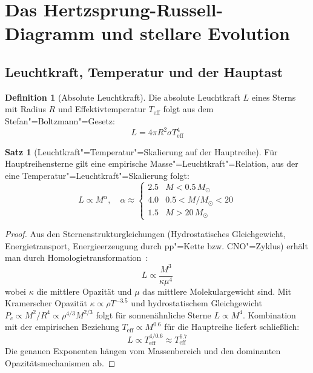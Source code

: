 ﻿\documentclass[a4paper,12pt]{article}
\theoremstyle{definition}
\newtheorem{definition}{Definition}
\newtheorem{satz}{Satz}
\begin{document}
\section{Das Hertzsprung-Russell-Diagramm und stellare Evolution}

\subsection{Leuchtkraft, Temperatur und der Hauptast}

\begin{definition}[Absolute Leuchtkraft]
    Die absolute Leuchtkraft $L$ eines Sterns mit Radius $R$ und
    Effektivtemperatur $T_{\text{eff}}$ folgt aus dem Stefan"=Boltzmann"=Gesetz:
    \[
        L = 4\pi R^2 \sigma T_{\text{eff}}^4
    \]
\end{definition}

\begin{satz}[Leuchtkraft"=Temperatur"=Skalierung auf der Hauptreihe]
\label{satz:hr}
    Für Hauptreihensterne gilt eine empirische Masse"=Leuchtkraft"=Relation,
    aus der eine Temperatur"=Leuchtkraft"=Skalierung folgt:
    \[
        L \propto M^\alpha, \quad \alpha \approx \begin{cases} 2.5 & M < 0.5\,M_\odot \\ 4.0 & 0.5 < M/M_\odot < 20 \\ 1.5 & M > 20\,M_\odot \end{cases}
    \]
\end{satz}

\begin{proof}
    Aus den Sternenstrukturgleichungen (Hydrostatisches Gleichgewicht,
    Energietransport, Energieerzeugung durch pp"=Kette bzw. CNO"=Zyklus)
    erhält man durch Homologietransformation~\cite{salaris2005}:
    \[
        L \propto \frac{M^3}{\kappa \mu^4}
    \]
    wobei $\kappa$ die mittlere Opazität und $\mu$ das mittlere
    Molekulargewicht sind. Mit Kramerscher Opazität $\kappa \propto \rho T^{-3.5}$
    und hydrostatischem Gleichgewicht $P_c \propto M^2/R^4 \propto \rho^{4/3} M^{2/3}$
    folgt für sonnenähnliche Sterne $L \propto M^4$.
    Kombination mit der empirischen Beziehung $T_{\text{eff}} \propto M^{0.6}$
    für die Hauptreihe liefert schließlich:
    \[
        L \propto T_{\text{eff}}^{4/0.6} \approx T_{\text{eff}}^{6.7}
    \]
    Die genauen Exponenten hängen vom Massenbereich und den dominanten
    Opazitätsmechanismen ab. \qedhere
\end{proof}
\end{document}
